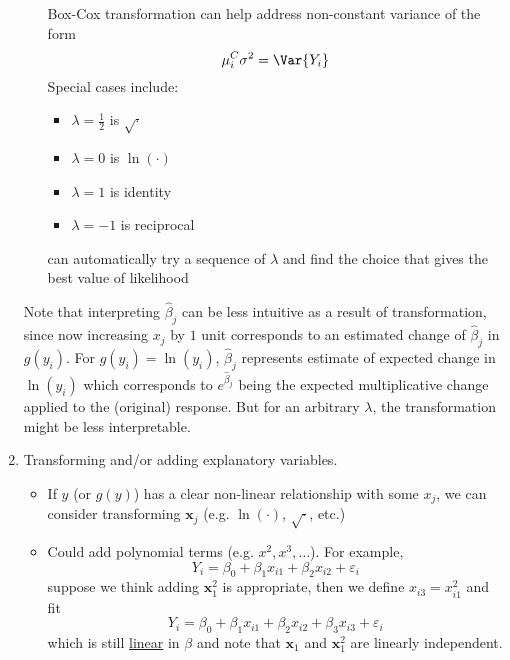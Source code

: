 \begin{enumerate}[label=(\arabic*)]
\begin{enumerate}[label=(\roman*)]
                    Box-Cox transformation can help address non-constant
                    variance of the form
                    \[ \mu_i^C\sigma^2=\Var{Y_i} \]
                    Special cases include:
                    \begin{itemize}
                        \item $ \displaystyle \lambda=\frac{1}{2} $ is $ \sqrt{\cdot} $
                        \item $ \lambda=0 $ is $ \ln(\cdot) $
                        \item $ \lambda=1 $ is identity
                        \item $ \lambda=-1 $ is reciprocal
                    \end{itemize}
                    can automatically try a sequence of $ \lambda $
                    and find the choice that gives the best value of
                    likelihood
          \end{enumerate}
          Note that interpreting $ \hat{\beta}_j $ can be less intuitive
          as a result of transformation, since now increasing $ x_j $
          by $ 1 $ unit corresponds to an estimated change of $ \hat{\beta}_j $
          in $ g(y_i) $. For $ g(y_i)=\ln(y_i) $, $ \hat{\beta}_j $
          represents estimate of expected change in $ \ln(y_i) $
          which corresponds to $ e^{\hat{\beta}_j} $ being
          the expected multiplicative change applied to the (original)
          response. But for an arbitrary $ \lambda $, the transformation
          might be less interpretable.
    \item Transforming and/or adding explanatory variables.
          \begin{itemize}
              \item If $ y $ (or $ g(y) $) has a clear non-linear
                    relationship with some $ x_j $, we can consider transforming
                    $ \symbf{x}_j $ (e.g. $ \ln(\cdot) $, $ \sqrt{\cdot} $, etc.)
              \item Could add polynomial terms (e.g. $ x^2,x^3,\ldots$). For example,
                    \[ Y_i=\beta_0+\beta_1x_{i1}+\beta_2x_{i2}+\varepsilon_i \]
                    suppose we think adding $ \symbf{x}_1^2 $ is appropriate,
                    then we define $ x_{i3}=x_{i1}^2 $ and fit
                    \[ Y_i=\beta_0+\beta_1x_{i1}+\beta_2x_{i2}+\beta_3x_{i3}+\varepsilon_i \]
                    which is still \underline{linear} in $ \beta $ and note that
                    $ \symbf{x}_1 $ and $ \symbf{x}_1^2 $ are linearly independent.

\end{itemize}
\end{enumerate}
